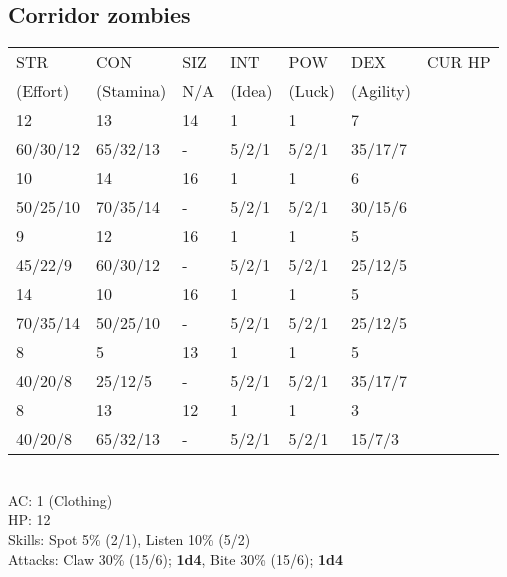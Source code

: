 \documentclass[12pt,a4paper]{article}
\begin{document}
\subsection*{Corridor zombies}
\begin{tabular}{| l | l | l | l | l | l |l|}
\hline
STR      & CON       & SIZ & INT    & POW    & DEX       & CUR HP\\
(Effort) & (Stamina) & N/A & (Idea) & (Luck) & (Agility) & \\
\hline

12       & 13       & 14  & 1     & 1     & 7 &\\
60/30/12 & 65/32/13 & -   & 5/2/1 & 5/2/1 & 35/17/7 &\\

\rowcolor{lightgray}
10       & 14       & 16 & 1     & 1     & 6 &\\
\rowcolor{lightgray}
50/25/10 & 70/35/14 & -  & 5/2/1 & 5/2/1 & 30/15/6 &\\

9       & 12       & 16 & 1     & 1     & 5 & \\
45/22/9 & 60/30/12 & -  & 5/2/1 & 5/2/1 & 25/12/5 &\\

\rowcolor{lightgray}
14       & 10       & 16  & 1     & 1     & 5 &\\
\rowcolor{lightgray}
70/35/14 & 50/25/10 & -   & 5/2/1 & 5/2/1 & 25/12/5 &\\

8        & 5        & 13  & 1     & 1     & 5 &\\
40/20/8  & 25/12/5  & -   & 5/2/1 & 5/2/1 & 35/17/7 &\\

\rowcolor{lightgray}
8       & 13       & 12  & 1     & 1     & 3 &\\
\rowcolor{lightgray}
40/20/8 & 65/32/13 & -   & 5/2/1 & 5/2/1 & 15/7/3 &\\
\hline
\end{tabular}
\vspace{0.2cm}
\\
AC: 1 (Clothing)\\
HP: 12\\
Skills: Spot 5\% (2/1), Listen 10\% (5/2)\\
Attacks: Claw 30\% (15/6); \textbf{1d4},  Bite 30\% (15/6); \textbf{1d4}
\end{document}
